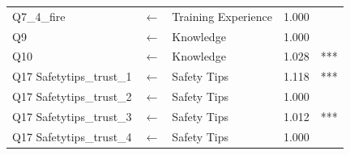 \begin{table}[h]
\begin{tabular}{|l|c|l|c|c|}
  Q7\_4\_fire & $\longleftarrow$ & Training Experience & 1.000 & \\
  Q9             & $\longleftarrow$ & Knowledge & 1.000 & \\
  Q10           & $\longleftarrow$ & Knowledge & 1.028 & *** \\
  Q17 Safetytips\_trust\_1 & $\longleftarrow$ & Safety Tips & 1.118 & *** \\
  Q17 Safetytips\_trust\_2 & $\longleftarrow$ & Safety Tips & 1.000 & \\
  Q17 Safetytips\_trust\_3 & $\longleftarrow$ & Safety Tips & 1.012 & *** \\
  Q17 Safetytips\_trust\_4 & $\longleftarrow$ & Safety Tips & 1.000 & \\
 \hline
  \end{tabular}
\end{table}

